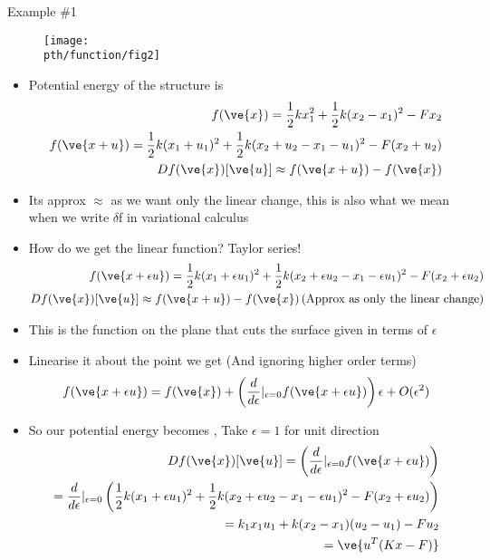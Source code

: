 	\begin{frame}{Example \#1}
		\begin{figure}
			\centering
			\texttt{[image: \\pth/function/fig2]}
			\label{fig:fig2}
		\end{figure}
		\begin{itemize}
			\item Potential energy of the structure is
			\begin{align*}
				f(\ve{x}) = \frac{1}{2}kx_1^2 + \frac{1}{2}k(x_2-x_1)^2 - Fx_2 \\
				f(\ve{x+u}) = \frac{1}{2}k(x_1+u_1)^2 + \frac{1}{2}k(x_2 + u_2-x_1-u_1)^2 - F(x_2 + u_2) \\ 
				Df(\ve{x})[\ve{u}] \approx f(\ve{x+u}) - f(\ve{x}) 			
			\end{align*}	
			\item  Its approx $\approx$ as we want only the linear change, this is also what we mean when we write $\delta$f in variational calculus		
		\end{itemize}
	\end{frame}

	\begin{frame}
		\begin{itemize}
			\item How do we get the linear function? Taylor series!
			\begin{align*}
			f(\ve{x+\epsilon u}) = \frac{1}{2}k(x_1+\epsilon u_1)^2 + \frac{1}{2}k(x_2 + \epsilon u_2-x_1-\epsilon u_1)^2 - F(x_2 + \epsilon u_2) \\ 
			Df(\ve{x})[\ve{u}] \approx f(\ve{x+u}) - f(\ve{x}) \left(\text{Approx as only the linear change} \right)			
			\end{align*}
			\item This is the function on the plane that cuts the surface given in terms of $\epsilon$
			\item Linearise it about the point we get (And ignoring higher order terms)
			\begin{align*}
				f(\ve{x+\epsilon u}) = f(\ve{x}) + \left(\frac{ d}{ d\epsilon}|_{\epsilon = 0} f(\ve{x+\epsilon u}) \right) \epsilon + O(\epsilon^2)
			\end{align*}
			\item So our potential energy becomes , Take $\epsilon =1$ for unit direction
			\begin{align*}
			Df(\ve{x})[\ve{u}] = \left(\frac{ d}{ d\epsilon}|_{\epsilon = 0} f(\ve{x+\epsilon u}) \right) \\
			= \frac{ d}{ d\epsilon}|_{\epsilon = 0}\left(  \frac{1}{2}k(x_1+\epsilon u_1)^2 + \frac{1}{2}k(x_2 + \epsilon u_2-x_1-\epsilon u_1)^2 - F(x_2 + \epsilon u_2) \right) \\
			=k_1x_1u_1 + k(x_2-x_1)(u_2-u_1) - Fu_2 \\
			= \ve{u^T(Kx-F)}
			\end{align*}
		\end{itemize}
	\end{frame}

